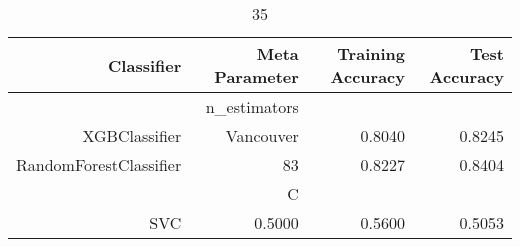
\begin{table}[H]
    \caption{35}
    \centering
    \begin{tabular}{|r|r|r|r|}
        \hline
        Classifier &Meta Parameter &Training Accuracy
        &Test Accuracy\\
        \hline
        &n\_estimators &\multicolumn{2}{|r|}{}\\
        \hline
        XGBClassifier &Vancouver &0.8040 &0.8245\\
        \hline
        RandomForestClassifier &83 &0.8227 &0.8404\\
        \hline
        &C &\multicolumn{2}{|r|}{}\\
        \hline
        SVC &0.5000 &0.5600 &0.5053\\
        \hline
    \end{tabular}
\end{table}

